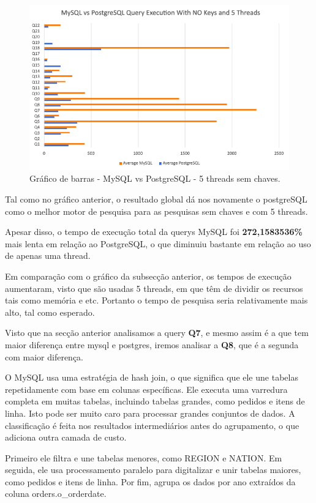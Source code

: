 \documentclass{article}
\begin{document}
\begin{figure}[H]
  \centering
  \includegraphics[width=\textwidth]{Graphs/mysqlvspostgres_withoutkeys_fivethreads.png}
  \caption{Gráfico de barras - MySQL vs PostgreSQL - 5 threads sem chaves.}
  \label{fig:PKCreation2}
\end{figure}

Tal como no gráfico anterior, o resultado global dá nos novamente o postgreSQL como o melhor motor de pesquisa para as pesquisas sem chaves e com 5 threads.

Apesar disso, o tempo de execução total da querys MySQL foi \textbf{272,1583536\%} mais lenta em relação ao PostgreSQL, o que diminuiu bastante em relação ao uso de apenas uma thread.

Em comparação com o gráfico da subsecção anterior, os tempos de execução aumentaram,
visto que são usadas 5 threads, em que têm de dividir os recursos tais como memória e etc. Portanto
o tempo de pesquisa seria relativamente mais alto, tal como esperado.

Visto que na secção anterior analisamos a query \textbf{Q7}, e mesmo assim é a que tem maior diferença entre mysql e postgres, iremos analisar a \textbf{Q8}, que é a segunda com maior diferença.

O MySQL usa uma estratégia de hash join, o que significa que ele une tabelas repetidamente com base em colunas específicas.
Ele executa uma varredura completa em muitas tabelas, incluindo tabelas grandes, como pedidos e itens de linha.
Isto pode ser muito caro para processar grandes conjuntos de dados.
A classificação é feita nos resultados intermediários antes do agrupamento, o que adiciona outra camada de custo.


Primeiro ele filtra e une tabelas menores, como REGION e NATION.
Em seguida, ele usa processamento paralelo para digitalizar e unir tabelas maiores, como pedidos e itens de linha.
Por fim, agrupa os dados por ano extraídos da coluna orders.o\_orderdate.
\end{document}
